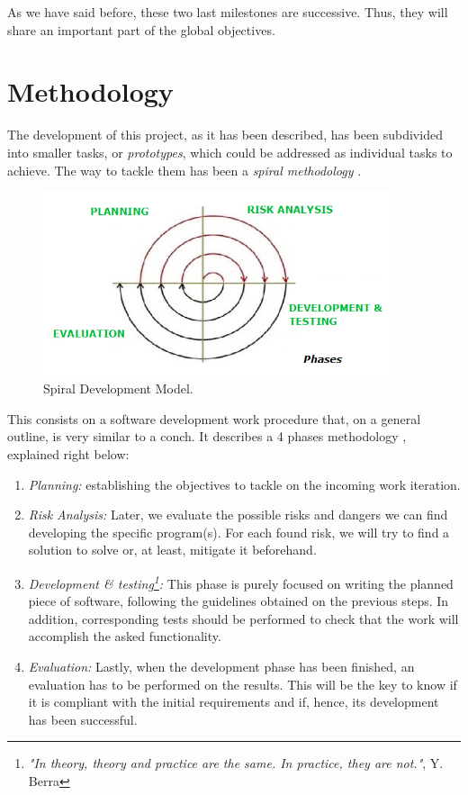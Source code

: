 As we have said before, these two last milestones are successive. Thus, they will share an important part of the global objectives.\\


\section{Methodology}
The development of this project, as it has been described, has been subdivided into smaller tasks, or \emph{prototypes}, which could be addressed as individual tasks to achieve. The way to tackle them has been a \textit{spiral methodology} \cite{boehm-spiral}.\\

\begin{figure}[h]
	\centering
	\includegraphics[width=4in]{images/spiral}
	\caption{Spiral Development Model.}
	\label{fig:2_spiral}
\end{figure}

This consists on a software development work procedure that, on a general outline, is very similar to a conch. It describes a 4 phases methodology \cite{spiral-steps}, explained right below:

\begin{enumerate}
	\item \textit{Planning:} establishing the objectives to tackle on the incoming work iteration.

	\item \textit{Risk Analysis:} Later, we evaluate the possible risks and dangers we can find developing the specific program(s). For each found risk, we will try to find a solution to solve or, at least, mitigate it beforehand.

	\item \textit{Development \& testing\footnote{\textit{"In theory, theory and practice are the same. In practice, they are not."}, Y. Berra}:} This phase is purely focused on writing the planned piece of software, following the guidelines obtained on the previous steps. In addition, corresponding tests should be performed to check that the work will accomplish the asked functionality.
	\item \textit{Evaluation:} Lastly, when the development phase has been finished, an evaluation has to be performed on the results. This will be the key to know if it is compliant with the initial requirements and if, hence, its development has been successful.
\end{enumerate}

